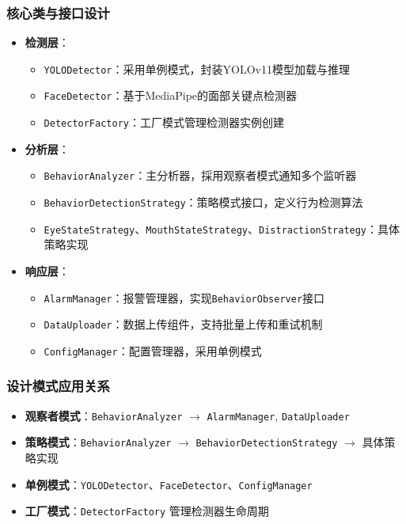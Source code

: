 \documentclass[a4paper,12pt]{article}
\begin{document}
\subsubsection{核心类与接口设计}
\begin{itemize}
  \item \textbf{检测层}：
    \begin{itemize}
      \item \texttt{YOLODetector}：采用单例模式，封装YOLOv11模型加载与推理
      \item \texttt{FaceDetector}：基于MediaPipe的面部关键点检测器
      \item \texttt{DetectorFactory}：工厂模式管理检测器实例创建
    \end{itemize}
  \item \textbf{分析层}：
    \begin{itemize}
      \item \texttt{BehaviorAnalyzer}：主分析器，採用观察者模式通知多个监听器
      \item \texttt{BehaviorDetectionStrategy}：策略模式接口，定义行为检测算法
      \item \texttt{EyeStateStrategy}、\texttt{MouthStateStrategy}、\texttt{DistractionStrategy}：具体策略实现
    \end{itemize}
  \item \textbf{响应层}：
    \begin{itemize}
      \item \texttt{AlarmManager}：报警管理器，实现\texttt{BehaviorObserver}接口
      \item \texttt{DataUploader}：数据上传组件，支持批量上传和重试机制
      \item \texttt{ConfigManager}：配置管理器，采用单例模式
    \end{itemize}
\end{itemize}

\subsubsection{设计模式应用关系}
\begin{itemize}
  \item \textbf{观察者模式}：\texttt{BehaviorAnalyzer} $\to$ \texttt{AlarmManager}, \texttt{DataUploader}
  \item \textbf{策略模式}：\texttt{BehaviorAnalyzer} $\to$ \texttt{BehaviorDetectionStrategy} $\to$ 具体策略实现
  \item \textbf{单例模式}：\texttt{YOLODetector}、\texttt{FaceDetector}、\texttt{ConfigManager}
  \item \textbf{工厂模式}：\texttt{DetectorFactory} 管理检测器生命周期
\end{itemize}
\end{document}
